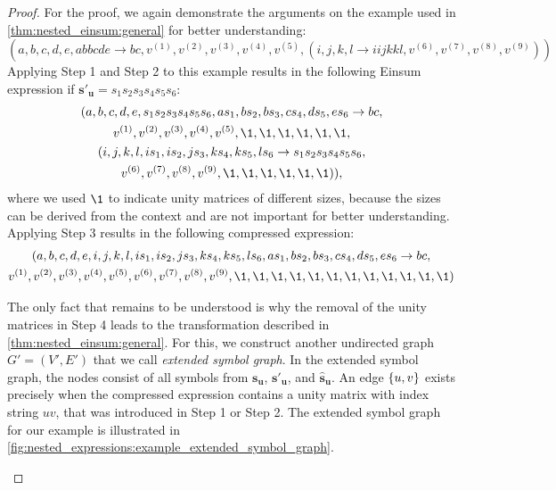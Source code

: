 \begin{proof}
    \small
    For the proof, we again demonstrate the arguments on the example used in \cref{thm:nested_einsum:general} for better understanding:
    $$(a,b,c,d,e,abbcde \rightarrow bc,v^{(1)}, v^{(2)}, v^{(3)}, v^{(4)}, v^{(5)}, (
        i,j,k,l \rightarrow iijkkl, v^{(6)}, v^{(7)}, v^{(8)}, v^{(9)}
        ))$$
    Applying Step 1 and Step 2 to this example results in the following Einsum expression if $\bm{s'_u} = s_1 s_2 s_3 s_4 s_5 s_6$:
    \begin{gather*}
        (a,b,c,d,e,s_1 s_2 s_3 s_4 s_5 s_6, a s_1, b s_2, b s_3, c s_4, d s_5, e s_6 \rightarrow bc,\\
        v^{(1)}, v^{(2)}, v^{(3)}, v^{(4)}, v^{(5)}, \1, \1, \1, \1, \1, \1,\\
        (i,j,k,l, i s_1, i s_2, j s_3, k s_4, k s_5, l s_6 \rightarrow s_1 s_2 s_3 s_4 s_5 s_6,\\
        v^{(6)}, v^{(7)}, v^{(8)}, v^{(9)}, \1, \1, \1, \1, \1, \1)),
    \end{gather*}
    where we used $\1$ to indicate unity matrices of different sizes, because the sizes can be derived from the context and are not important for better understanding.
    Applying Step 3 results in the following compressed expression:
    \begin{gather*}
        (a,b,c,d,e,i,j,k,l, i s_1, i s_2, j s_3, k s_4, k s_5, l s_6, a s_1, b s_2, b s_3, c s_4, d s_5, e s_6 \rightarrow bc,\\
        v^{(1)}, v^{(2)}, v^{(3)}, v^{(4)}, v^{(5)}, v^{(6)}, v^{(7)}, v^{(8)}, v^{(9)}, \1, \1, \1, \1, \1, \1, \1, \1, \1, \1, \1, \1)
    \end{gather*}

    The only fact that remains to be understood is why the removal of the unity matrices in Step 4 leads to the transformation described in \cref{thm:nested_einsum:general}.
    For this, we construct another undirected graph $G' = (V', E')$ that we call \textit{extended symbol graph}.
    In the extended symbol graph, the nodes consist of all symbols from $\bm{s_u}$, $\bm{s'_u}$, and $\bm{\hat{s}_u}$.
    An edge $\smallset{u,v}$ exists precisely when the compressed expression contains a unity matrix with index string $uv$, that was introduced in Step 1 or Step 2.
    The extended symbol graph for our example is illustrated in \cref{fig:nested_expressions:example_extended_symbol_graph}.

    \begin{figure}[h]
        \centering
        \begin{tikzpicture}[semithick, scale=0.6]


\end{tikzpicture}
\end{figure}
\end{proof}
